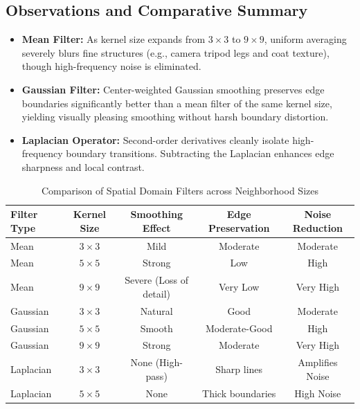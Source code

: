 \documentclass[12pt]{article}
\begin{document}
\subsection{Observations and Comparative Summary}
\begin{itemize}
    \item \textbf{Mean Filter:} As kernel size expands from $3\times 3$ to $9\times 9$, uniform averaging severely blurs fine structures (e.g., camera tripod legs and coat texture), though high-frequency noise is eliminated.
    \item \textbf{Gaussian Filter:} Center-weighted Gaussian smoothing preserves edge boundaries significantly better than a mean filter of the same kernel size, yielding visually pleasing smoothing without harsh boundary distortion.
    \item \textbf{Laplacian Operator:} Second-order derivatives cleanly isolate high-frequency boundary transitions. Subtracting the Laplacian enhances edge sharpness and local contrast.
\end{itemize}

\begin{table}[H]
\centering
\small
\caption{Comparison of Spatial Domain Filters across Neighborhood Sizes}
\begin{tabular}{lcccc}
\toprule
\textbf{Filter Type} & \textbf{Kernel Size} & \textbf{Smoothing Effect} & \textbf{Edge Preservation} & \textbf{Noise Reduction} \\
\midrule
Mean & $3\times 3$ & Mild & Moderate & Moderate \\
Mean & $5\times 5$ & Strong & Low & High \\
Mean & $9\times 9$ & Severe (Loss of detail) & Very Low & Very High \\
Gaussian & $3\times 3$ & Natural & Good & Moderate \\
Gaussian & $5\times 5$ & Smooth & Moderate-Good & High \\
Gaussian & $9\times 9$ & Strong & Moderate & Very High \\
Laplacian & $3\times 3$ & None (High-pass) & Sharp lines & Amplifies Noise \\
Laplacian & $5\times 5$ & None & Thick boundaries & High Noise \\
\bottomrule
\end{tabular}
\end{table}

\end{document}
